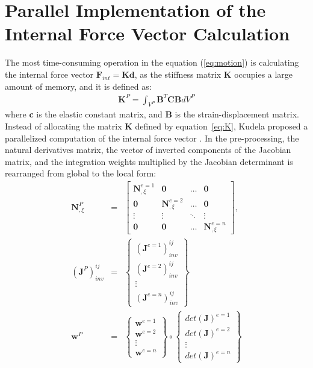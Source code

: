 \section{Parallel Implementation of the Internal Force Vector Calculation}
\label{sec:gpu}


The most time-consuming operation in the equation (\ref{eq:motion}) is calculating the internal force vector $\textbf{F}_{int}=\textbf{Kd}$, as the stiffness matrix \textbf{K} occupies a large amount of memory, and it is defined as:
\begin{eqnarray}
	\label{eq:K}
	\textbf{K}^P=\int_{V^P}\textbf{B}^T\textbf{C}\textbf{B}dV^P
\end{eqnarray}
where \textbf{c} is the elastic constant matrix, and \textbf{B} is the strain-displacement matrix.
Instead of allocating the matrix \textbf{K} defined by equation~\ref{eq:K}, Kudela proposed a parallelized computation of the internal force vector \cite{kudela2016parallel}.
In the pre-processing, the natural derivatives matrix, the vector of inverted components of the Jacobian matrix, and the integration weights multiplied by the Jacobian determinant is rearranged from global to the local form:
\begin{eqnarray}
	\label{eq:isoparametric}
	\textbf{N}^P_{,\xi} & = & \left[ \begin{array}{cccc}
		\textbf{N}^{e=1}_{,\xi} & \textbf{0} & \ldots & \textbf{0}\\
		\textbf{0} & \textbf{N}^{e=2}_{,\xi} & \ldots & \textbf{0}\\
		\vdots & \vdots &  \ddots & \vdots\\
		\textbf{0} & \textbf{0} & \ldots & \textbf{N}^{e=n}_{,\xi}
	\end{array}\right],\\
	\label{eq:jacob}
	\left(\textbf{J}^P\right)^{ij}_{inv} & = & \left\{ \begin{array}{c}
		\left(\textbf{J}^{e=1}\right)^{ij}_{inv}\\
		\left(\textbf{J}^{e=2}\right)^{ij}_{inv}\\
		\vdots\\
		\left(\textbf{J}^{e=n}\right)^{ij}_{inv} \end{array}\right\}\\
	\label{eq:intWeights}
	\textbf{w}^P & = & \left\{ \begin{array}{c}
		\textbf{w}^{e=1}\\
		\textbf{w}^{e=2}\\
		\vdots\\
		\textbf{w}^{e=n} \end{array}\right\} \circ
	\left\{ \begin{array}{c}
		det(\textbf{J})^{e=1}\\
		det(\textbf{J})^{e=2}\\
		\vdots\\
		det(\textbf{J})^{e=n} \end{array}\right\}
\end{eqnarray}
